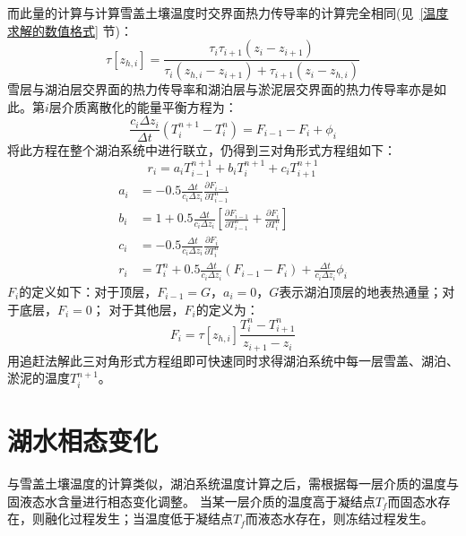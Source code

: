 而此量的计算与计算雪盖土壤温度时交界面热力传导率的计算完全相同(见~\ref{温度求解的数值格式} 节)：
\begin{equation}
    \tau\left[z_{h,i}\right]=\frac{\tau_i\tau_{i+1}\left(z_i-z_{i+1}\right)}{\tau_i\left(z_{h,i}-z_{i+1}\right)
    +\tau_{i+1}\left(z_i-z_{h,i}\right)}
\end{equation}
雪层与湖泊层交界面的热力传导率和湖泊层与淤泥层交界面的热力传导率亦是如此。第$i$层介质离散化的能量平衡方程为：
\begin{equation}
\frac{c_{i} \Delta z_{i}}{\Delta t}\left(T_{i}^{n+1}-T_{i}^{n}\right)=F_{i-1}-F_{i}+\phi_{i}
\end{equation}
将此方程在整个湖泊系统中进行联立，仍得到三对角形式方程组如下：
\begin{equation}
r_{i}=a_{i} T_{i-1}^{n+1}+b_{i} T_{i}^{n+1}+c_{i} T_{i+1}^{n+1}
\end{equation}
\begin{equation}
\begin{aligned}
a_{i} &=-0.5 \frac{\Delta t}{c_{i} \Delta z_{i}}\frac{\partial F_{i-1}}{\partial T_{i-1}^{n}} \\ 
b_{i} &=1+0.5 \frac{\Delta t}{c_{i} \Delta z_{i}}\left[\frac{\partial F_{i-1}}{\partial T_{i-1}^{n}}+\frac{\partial F_{i}}{\partial T_{i}^{n}}\right] \\
c_{i} &=-0.5 \frac{\Delta t}{c_{i} \Delta z_{i}} \frac{\partial F_{i}}{\partial T_{i}^{n}} \\ 
r_{i} &=T_{i}^{n}+0.5 \frac{\Delta t}{c_{i} \Delta z_{i}}\left(F_{i-1}-F_{i}\right)+\frac{\Delta t}{c_{i}\Delta z_{i}} \phi_{i}
\end{aligned}
\end{equation}
$F_i$的定义如下：对于顶层，$F_{i-1}=G$，$a_i=0$，$G$表示湖泊顶层的地表热通量；对于底层，$F_i=0$；
对于其他层，$F_i$的定义为：
\begin{equation}
F_{i}=\tau\left[z_{h, i}\right] \frac{T_{i}^{n}-T_{i+1}^{n}}{z_{i+1}-z_{i}}
\end{equation}
用追赶法解此三对角形式方程组即可快速同时求得湖泊系统中每一层雪盖、湖泊、淤泥的温度$T_i^{n+1}$。
\section{湖水相态变化}\label{湖水相态变化}
与雪盖土壤温度的计算类似，湖泊系统温度计算之后，需根据每一层介质的温度与固液态水含量进行相态变化调整。
当某一层介质的温度高于凝结点$T_f$而固态水存在，则融化过程发生；当温度低于凝结点$T_f$而液态水存在，则冻结过程发生。


